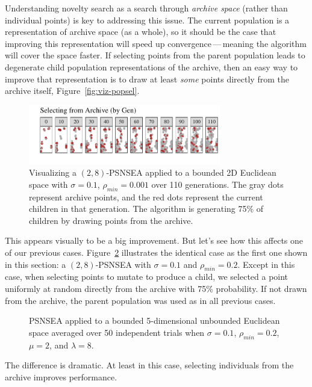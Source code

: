 \documentclass[twoside]{article}
\begin{document}
Understanding novelty search as a search through \emph{archive space} (rather than individual points) is key to addressing this issue.  The current population is a representation of archive space (as a whole), so it should be the case that improving this representation will speed up convergence\,---\,meaning the algorithm will cover the space faster.  If selecting points from the parent population leads to degenerate child population representations of the archive, then an easy way to improve that representation is to draw at least \emph{some} points directly from the archive itself, Figure~\ref{fig:viz-popsel}.   
%
\begin{figure}[h]
  \center\includegraphics[width=0.75\textwidth]{Figures/viz-archive-and-pop-s01-r0001-mu16lam32-archsell.pdf}
  \caption{\label{fig:viz-archsell} Visualizing a $(2,8)$-PSNSEA applied to a bounded 2D Euclidean space with $\sigma=0.1$, $\rho_{min}=0.001$ over 110 generations.  The gray dots represent archive points, and the red dots represent the current children in that generation.  The algorithm is generating 75\% of children by drawing points from the archive.}
\end{figure}

This appears visually to be a big improvement.  But let's see how this affects one of our previous cases.  Figure~\ref{fig:bounded:viz:mu2lam8:0102} illustrates the identical case as the first one shown in this section:  a $(2,8)$-PSNSEA with $\sigma=0.1$ and $\rho_{min}=0.2$.  Except in this case, when selecting points to mutate to produce a child, we selected a point uniformly at random directly from the archive with 75\% probability.  If not drawn from the archive, the parent population was used as in all previous cases.
%
\begin{figure}[ht]
  \caption{\label{fig:bounded:viz:mu2lam8:0102} PSNSEA applied to a bounded 5-dimensional unbounded Euclidean space averaged over 50 independent trials when $\sigma=0.1$, $\rho_{min}=0.2$, $\mu=2$, and $\lambda=8$.}
\end{figure}

The difference is dramatic.  At least in this case, selecting individuals from the archive improves performance.  
\end{document}

